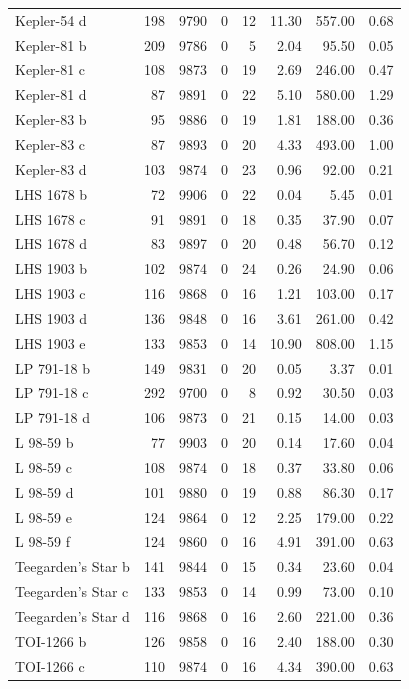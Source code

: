 \begin{table}
\begin{tabular}{lrrrrrrr}
Kepler-54 d & 198 & 9790 & 0 & 12 & 11.30 & 557.00 & 0.68 \\
Kepler-81 b & 209 & 9786 & 0 & 5 & 2.04 & 95.50 & 0.05 \\
Kepler-81 c & 108 & 9873 & 0 & 19 & 2.69 & 246.00 & 0.47 \\
Kepler-81 d & 87 & 9891 & 0 & 22 & 5.10 & 580.00 & 1.29 \\
Kepler-83 b & 95 & 9886 & 0 & 19 & 1.81 & 188.00 & 0.36 \\
Kepler-83 c & 87 & 9893 & 0 & 20 & 4.33 & 493.00 & 1.00 \\
Kepler-83 d & 103 & 9874 & 0 & 23 & 0.96 & 92.00 & 0.21 \\
LHS 1678 b & 72 & 9906 & 0 & 22 & 0.04 & 5.45 & 0.01 \\
LHS 1678 c & 91 & 9891 & 0 & 18 & 0.35 & 37.90 & 0.07 \\
LHS 1678 d & 83 & 9897 & 0 & 20 & 0.48 & 56.70 & 0.12 \\
LHS 1903 b & 102 & 9874 & 0 & 24 & 0.26 & 24.90 & 0.06 \\
LHS 1903 c & 116 & 9868 & 0 & 16 & 1.21 & 103.00 & 0.17 \\
LHS 1903 d & 136 & 9848 & 0 & 16 & 3.61 & 261.00 & 0.42 \\
LHS 1903 e & 133 & 9853 & 0 & 14 & 10.90 & 808.00 & 1.15 \\
LP 791-18 b & 149 & 9831 & 0 & 20 & 0.05 & 3.37 & 0.01 \\
LP 791-18 c & 292 & 9700 & 0 & 8 & 0.92 & 30.50 & 0.03 \\
LP 791-18 d & 106 & 9873 & 0 & 21 & 0.15 & 14.00 & 0.03 \\
L 98-59 b & 77 & 9903 & 0 & 20 & 0.14 & 17.60 & 0.04 \\
L 98-59 c & 108 & 9874 & 0 & 18 & 0.37 & 33.80 & 0.06 \\
L 98-59 d & 101 & 9880 & 0 & 19 & 0.88 & 86.30 & 0.17 \\
L 98-59 e & 124 & 9864 & 0 & 12 & 2.25 & 179.00 & 0.22 \\
L 98-59 f & 124 & 9860 & 0 & 16 & 4.91 & 391.00 & 0.63 \\
Teegarden's Star b & 141 & 9844 & 0 & 15 & 0.34 & 23.60 & 0.04 \\
Teegarden's Star c & 133 & 9853 & 0 & 14 & 0.99 & 73.00 & 0.10 \\
Teegarden's Star d & 116 & 9868 & 0 & 16 & 2.60 & 221.00 & 0.36 \\
TOI-1266 b & 126 & 9858 & 0 & 16 & 2.40 & 188.00 & 0.30 \\
TOI-1266 c & 110 & 9874 & 0 & 16 & 4.34 & 390.00 & 0.63 \\

\end{tabular}
\end{table}
